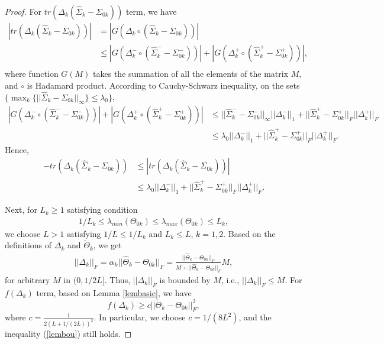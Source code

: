 \documentclass[review]{elsarticle}
\newcommand{\1}{{\bf 1}}
\newcommand{\0}{{\bf 0}}
\newcommand{\bqa}{\begin{eqnarray}}
\newcommand{\eqa}{\end{eqnarray}}
\newtheorem{proof}{Proof}
\begin{document}
\begin{appendices}
\begin{proof}
 For $tr(\Delta_k(\widehat{\Sigma}_k-\Sigma_{0k}))$ term, we have
\begin{equation}
\begin{aligned}
|tr(\Delta_k(\widehat{\Sigma}_k-\Sigma_{0k}))|&=|G(\Delta_k\circ (\widehat{\Sigma}_k-\Sigma_{0k}))|\\
&\leq|G(\Delta_k^{-}\circ (\widehat{\Sigma}_k^{-}-\Sigma_{0k}^{-}))|+|G(\Delta_k^{+}\circ (\widehat{\Sigma}_k^{+}-\Sigma_{0k}^{+}))|,\\
\end{aligned}
\end{equation}
 where function $G(M)$ takes the summation of all the elements of the matrix $M$, and $\circ$ is Hadamard product.
 According to Cauchy-Schwarz inequality, on the sets $\{\max_k\{||\widehat{\Sigma}_k-\Sigma_{0k}||_{\infty}\}\leq\lambda_0\}$,
\begin{equation}
\begin{aligned}
|G(\Delta_k^{-}\circ (\widehat{\Sigma}_k^{-}-\Sigma_{0k}^{-}))|+|G(\Delta_k^{+}\circ (\widehat{\Sigma}_k^{+}-\Sigma_{0k}^{+}))|
&\leq ||\widehat{\Sigma}_{k}^{-}-
\Sigma_{0k}^{-}||_{\infty}||\Delta_k^{-}||_1+||\widehat{\Sigma}_{k}^{+}-
\Sigma_{0k}^{+}||_F||\Delta_k^{+}||_{F}\\
&\leq \lambda_0||\Delta_k^{-}||_1+||\widehat{\Sigma}_{k}^{+}-
\Sigma_{0k}^{+}||_F||\Delta_k^{+}||_{F}.
\end{aligned}
\end{equation}
 Hence,
\begin{equation}\label{trabou}
\begin{aligned}
-tr(\Delta_k(\widehat{\Sigma}_k-\Sigma_{0k}))& \leq
|tr(\Delta_k(\widehat{\Sigma}_k-\Sigma_{0k}))|\\
&\leq \lambda_0||\Delta_k^{-}||_1+||\widehat{\Sigma}_{k}^{+}-
\Sigma_{0k}^{+}||_F||\Delta_k^{+}||_{F}.
\end{aligned}
\end{equation}

 Next, for $L_k\geq 1$ satisfying condition
\bqa
1/L_k\leq \lambda_{min}(\Theta_{0k})\leq \lambda_{max}(\Theta_{0k})\leq L_k,
\eqa
 we choose $L>1$ satisfying $1/L\leq 1/L_k$ and $L_k\leq L$, $k=1,2.$
 Based on the definitions of $\Delta_k$ and $\widetilde{\Theta}_k$, we get
\begin{equation}\label{deltaine}
\begin{aligned}
||\Delta_k||_{F}=\alpha_k||\widehat{\Theta}_k-\Theta_{0k}||_{F}
=\frac{||\widehat{\Theta}_k-\Theta_{0k}||_{F}}{M+||\widehat{\Theta}_k-\Theta_{0k}||_{F}}M,
\end{aligned}
\end{equation}
 for arbitrary $M$ in $(0,1/2L]$.
 Thus, $||\Delta_k||_{F}$ is bounded by $M$, i.e., $||\Delta_k||_{F}\leq M$.
 For $f(\Delta_k)$ term, based on Lemma \ref{lembasic}, we have
\begin{equation}\label{lembou}
f(\Delta_k) \geq c||\widetilde{\Theta}_k-\Theta_{0k}||_{F}^{2},
\end{equation}
 where $c=\frac{1}{2(L+1/(2L))^2}$. In particular, we choose $c=1/(8L^2)$, and the inequality (\ref{lembou}) still holds.


\end{proof}
\end{appendices}
\end{document}
